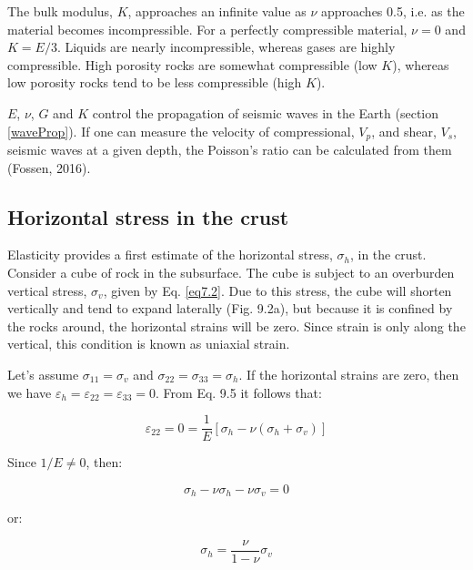 \documentclass[a4paper , 12pt]{book}
\begin{document}
The bulk modulus, $K$, approaches an infinite value as $\nu$ approaches 0.5, i.e. as the material becomes incompressible. For a perfectly compressible material, $\nu=0$ and $K=E/3$. Liquids are nearly incompressible, whereas gases are highly compressible. High porosity rocks are somewhat compressible (low $K$), whereas low porosity rocks tend to be less compressible (high $K$). 

$E$, $\nu$, $G$ and $K$ control the propagation of seismic waves in the Earth (section \ref{waveProp}). If one can measure the velocity of compressional, $V_p$, and shear, $V_s$, seismic waves at a given depth, the Poisson's ratio can be calculated from them (Fossen, 2016).

\subsection{Horizontal stress in the crust}

Elasticity provides a first estimate of the horizontal stress, $\sigma_h$, in the crust. Consider a cube of rock in the subsurface. The cube is subject to an overburden vertical stress, $\sigma_v$, given by Eq. \ref{eq7.2}. Due to this stress, the cube will shorten vertically and tend to expand laterally (Fig. 9.2a), but because it is confined by the rocks around, the horizontal strains will be zero. Since strain is only along the vertical, this condition is known as uniaxial strain.

Let's assume $\sigma_{11}=\sigma_v$ and $\sigma_{22}=\sigma_{33}=\sigma_h$. If the horizontal strains are zero, then we have $\varepsilon_h=\varepsilon_{22}=\varepsilon_{33}=0$. From Eq. 9.5 it follows that:

\begin{equation}
    \varepsilon_{22}=0=\frac{1}{E}[\sigma_h-\nu(\sigma_h+\sigma_v)]
\end{equation}

Since $1/E\neq 0$, then:

\begin{equation}
    \sigma_h-\nu\sigma_h-\nu\sigma_v=0
\end{equation}

or:

\begin{equation}
    \sigma_h=\frac{\nu}{1-\nu}\sigma_v
\end{equation}
\end{document}
